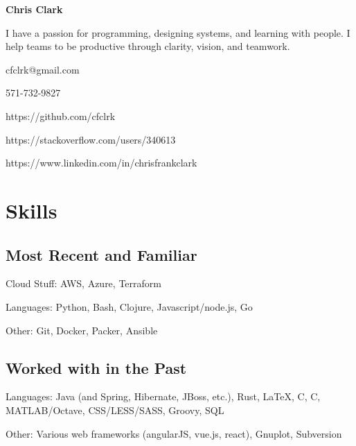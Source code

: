 \documentclass[12pt]{article}
\def\CC{{C\nolinebreak[4]\hspace{-.05em}\raisebox{.4ex}{\tiny\bf ++}}}
\begin{document}
\begin{center}
  {\sffamily\huge\textbf{Chris Clark}}
\end{center}


\begin{tcolorbox}[
    topbar,
    width=(\linewidth-2mm)/2,
    coltext=violet,
    halign=left,
    fontupper=\itshape\bfseries\sffamily\large]
  I have a passion for programming, designing systems, and learning with people.
  I help teams to be productive through clarity, vision, and teamwork.
\end{tcolorbox}
\begin{tcolorbox}[topbar,width=(\linewidth-2mm)/2]
  cfclrk@gmail.com

  571-732-9827

  https://github.com/cfclrk

  https://stackoverflow.com/users/340613

  https://www.linkedin.com/in/chrisfrankclark
\end{tcolorbox}


\section*{Skills}

\begin{multicols}{2}
  \raggedright

  \subsection*{Most Recent and Familiar}

  Cloud Stuff: AWS, Azure, Terraform

  Languages: Python, Bash, Clojure, Javascript/node.js, Go

  Other: Git, Docker, Packer, Ansible

  \subsection*{Worked with in the Past}

  Languages: Java (and Spring, Hibernate, JBoss, etc.), Rust, \LaTeX, C, \CC,
  MATLAB/Octave, CSS/LESS/SASS, Groovy, SQL

  Other: Various web frameworks (angularJS, vue.js, react), Gnuplot,
  Subversion

  \vfill
  \columnbreak

\end{multicols}
\end{document}
